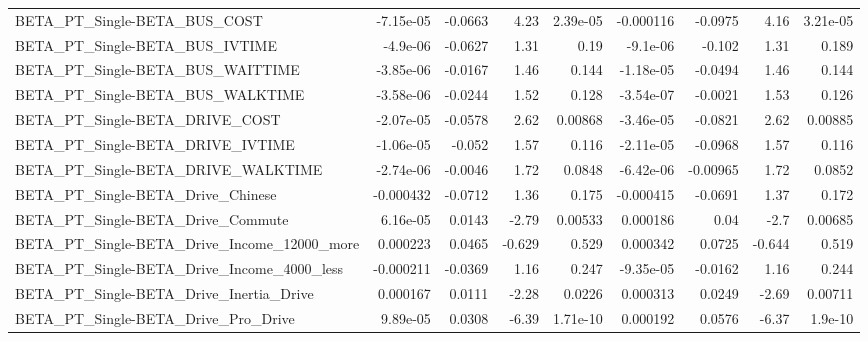 \begin{tabular}{lrrrrrrrr}
BETA\_PT\_Single-BETA\_BUS\_COST                       &   -7.15e-05 &      -0.0663 &     4.23 & 2.39e-05 &  -0.000116 &     -0.0975 &         4.16 &      3.21e-05 \\
BETA\_PT\_Single-BETA\_BUS\_IVTIME                     &    -4.9e-06 &      -0.0627 &     1.31 &     0.19 &   -9.1e-06 &      -0.102 &         1.31 &         0.189 \\
BETA\_PT\_Single-BETA\_BUS\_WAITTIME                   &   -3.85e-06 &      -0.0167 &     1.46 &    0.144 &  -1.18e-05 &     -0.0494 &         1.46 &         0.144 \\
BETA\_PT\_Single-BETA\_BUS\_WALKTIME                   &   -3.58e-06 &      -0.0244 &     1.52 &    0.128 &  -3.54e-07 &     -0.0021 &         1.53 &         0.126 \\
BETA\_PT\_Single-BETA\_DRIVE\_COST                     &   -2.07e-05 &      -0.0578 &     2.62 &  0.00868 &  -3.46e-05 &     -0.0821 &         2.62 &       0.00885 \\
BETA\_PT\_Single-BETA\_DRIVE\_IVTIME                   &   -1.06e-05 &       -0.052 &     1.57 &    0.116 &  -2.11e-05 &     -0.0968 &         1.57 &         0.116 \\
BETA\_PT\_Single-BETA\_DRIVE\_WALKTIME                 &   -2.74e-06 &      -0.0046 &     1.72 &   0.0848 &  -6.42e-06 &    -0.00965 &         1.72 &        0.0852 \\
BETA\_PT\_Single-BETA\_Drive\_Chinese                  &   -0.000432 &      -0.0712 &     1.36 &    0.175 &  -0.000415 &     -0.0691 &         1.37 &         0.172 \\
BETA\_PT\_Single-BETA\_Drive\_Commute                  &    6.16e-05 &       0.0143 &    -2.79 &  0.00533 &   0.000186 &        0.04 &         -2.7 &       0.00685 \\
BETA\_PT\_Single-BETA\_Drive\_Income\_12000\_more        &    0.000223 &       0.0465 &   -0.629 &    0.529 &   0.000342 &      0.0725 &       -0.644 &         0.519 \\
BETA\_PT\_Single-BETA\_Drive\_Income\_4000\_less         &   -0.000211 &      -0.0369 &     1.16 &    0.247 &  -9.35e-05 &     -0.0162 &         1.16 &         0.244 \\
BETA\_PT\_Single-BETA\_Drive\_Inertia\_Drive            &    0.000167 &       0.0111 &    -2.28 &   0.0226 &   0.000313 &      0.0249 &        -2.69 &       0.00711 \\
BETA\_PT\_Single-BETA\_Drive\_Pro\_Drive                &    9.89e-05 &       0.0308 &    -6.39 & 1.71e-10 &   0.000192 &      0.0576 &        -6.37 &       1.9e-10 \\

\end{tabular}
